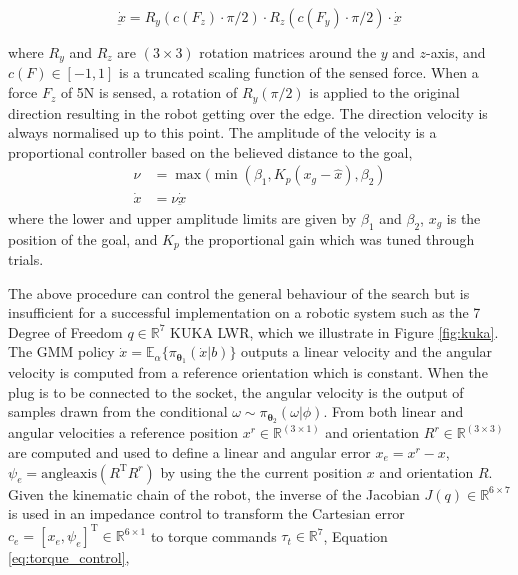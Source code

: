 \documentclass[final,3p,times,twocolumn]{elsarticle}
\newcommand{\Param}{\boldsymbol{\theta}}
\begin{document}
\begin{equation}
  \dot{\underbar{x}} = R_y(c(F_z) \cdot \pi/2) \cdot R_z(c(F_y) \cdot \pi/2) \cdot \dot{\underbar{x}} \label{eq:modulation}
\end{equation}

where $R_y$ and $R_z$ are $(3 \times 3)$ rotation matrices around the $y$ and $z$-axis, and $c(F) \in [-1,1]$ is a truncated scaling function of the sensed 
force.  When a force $F_z$ of 5N is sensed, a rotation of $R_y(\pi/2)$ is applied to the original direction resulting in the robot
getting over the edge. The direction velocity is always normalised up to this point. The amplitude of the velocity is a proportional
controller based on the believed distance to the goal,
\begin{align}
  \nu     &= \max(\min(\beta_1,K_p (x_g - \hat{x}),\beta_2)\label{eq:prop_speed}\\ \nonumber
  \dot{x} &= \nu \dot{\underbar{x}}
\end{align}
where the lower and upper amplitude limits are given by $\beta_1$ and $\beta_2$, $x_g$ is the position of the
goal, and $K_p$ the proportional gain which was tuned through trials. 


The above procedure can control the general behaviour of the search but is insufficient for a successful implementation on a robotic system 
such as the 7 Degree of Freedom $q\in\mathbb{R}^7$ KUKA LWR, which we illustrate in Figure \ref{fig:kuka}. 
The GMM policy $\dot{x} = \mathbb{E}_{\alpha}\{\pi_{\Param_1}(\dot{x}|b)\}$ outputs a linear velocity and the 
angular velocity is computed from a reference orientation which is constant. When the plug is to be connected to the socket, 
the angular velocity is the output of samples drawn from the conditional $\omega \sim \pi_{\Param_2}(\omega|\phi)$.
From both linear and angular velocities a reference position $x^r \in \mathbb{R}^{(3 \times 1)}$ and orientation $R^r \in \mathbb{R}^{(3 \times 3)}$ are computed and used to 
define a linear and angular error $x_e = x^r - x$, $\psi_e = \mathrm{angleaxis}(R^{\mathrm{T}}R^r)$ by using the  
the current position $x$ and orientation $R$.
Given the kinematic chain of the robot, the inverse of the Jacobian $J(q) \in \mathbb{R}^{6\times 7}$ is used in an impedance control to transform the 
Cartesian error $c_e = [x_e,\psi_e]^{\mathrm{T}} \in \mathbb{R}^{6 \times 1}$ to torque commands $\tau_t \in \mathbb{R}^7$, Equation \ref{eq:torque_control},
\end{document}
